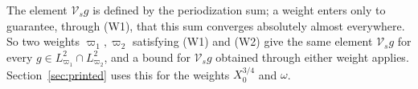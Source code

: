 The element $\mathcal V_sg$ is defined by the periodization sum; a weight enters only to guarantee, through \textup{(W1)}, that this
sum converges absolutely almost everywhere. So two weights $\varpi_1,\varpi_2$ satisfying \textup{(W1)} and \textup{(W2)} give the same element
$\mathcal V_sg$ for every $g\in L^2_{\varpi_1}\cap L^2_{\varpi_2}$, and a bound for $\mathcal V_sg$ obtained through either weight applies.
Section~\ref{sec:printed} uses this for the weights $X_0^{3/4}$ and $\omega$.
